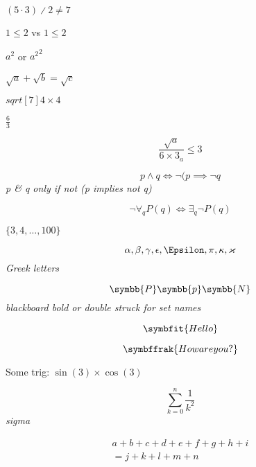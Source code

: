 \documentclass{article}
\begin{document}
\((5 \cdot 3) \divslash 2 \not= 7\)

\(1 \leq 2\) vs \( 1 \leqslant 2\)

\(a^2\) or \({a^2}^2\)

\(\sqrt{a} + \sqrt{b} = \sqrt{c}\)

\(sqrt[7]{4 \times 4}\)

\(\frac{6}{3}\)

\[\frac{\sqrt{a}}{6 \times 3_a} \leqslant 3\]

\begin{equation}
p \land q \iff \lnot  (p \implies \lnot q
\end{equation}
\textit{p \& q only if not (p implies not q)}

\[ \lnot\forall_{q} P(q) \iff \exists_{q}\lnot P(q)\]

\(\{3,4, \ldots, 100\}\)

\begin{equation}
\alpha, \beta, \gamma, \epsilon, \Epsilon, \pi, \kappa, \varkappa
\end{equation}
\textit{Greek letters}

\begin{equation}
\symbb{P} \symbb{p} \symbb{N}
\end{equation}
\textit{blackboard bold or double struck for set names}

\[ \symbfit{Hello}\]

\[ \symbffrak{How are you?}\]

Some trig: \(\sin(3) \times \cos(3)\)

\begin{equation}
\sum_{k=0}^{n} \frac{1}{k^2}
\end{equation}
\textit{sigma}

\begin{multline}
a + b + c + d + e
+ f + g + h + i \\
= j + k + l + m + n
\end{multline}
\end{document}
